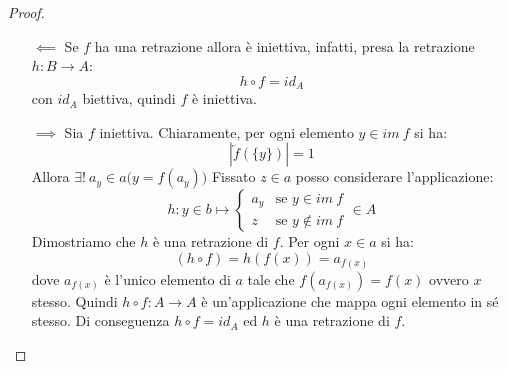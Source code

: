 \begin{proof}
	\begin{itemize}
	\item[$\impliedby$] Se $f$ ha una retrazione allora è iniettiva, infatti, presa la retrazione $h: B \longrightarrow A$:
	\begin{displaymath}
		h \circ f = id_{A}
	\end{displaymath}
	con $id_{A}$ biettiva, quindi $f$ è iniettiva.
	
	\item[$\implies$] Sia $f$ iniettiva. Chiaramente, per ogni elemento $y \in im \ f$ si ha:
	\begin{displaymath}
		|\overleftarrow{f}(\{y\})|=1
	\end{displaymath}
	Allora $\exists ! \ a_{y} \in a \bigl( y=f(a_{y})\bigr)$
	Fissato $z \in a$ posso considerare l'applicazione:
	\begin{displaymath}
		h: y \in b \mapsto
		\begin{cases}
			a_{y} & \mbox{se }y \in im \ f     \\
			z     & \mbox{se } y \notin im \ f
		\end{cases}
		\in A
	\end{displaymath}
	Dimostriamo che $h$ è una retrazione di $f$. Per ogni $x \in a$ si ha:
	\begin{displaymath}
		(h \circ f) = h(f(x)) = a_{f(x)}
	\end{displaymath}
	dove $a_{f(x)}$ è l'unico elemento di $a$ tale che $f(a_{f(x)})=f(x)$ ovvero $x$ stesso. Quindi $h \circ f: A \longrightarrow A$ è un'applicazione che mappa ogni elemento in sé stesso. Di conseguenza $h \circ f = id_{A}$ ed $h$ è una retrazione di $f$.
	\end{itemize}
\end{proof}

